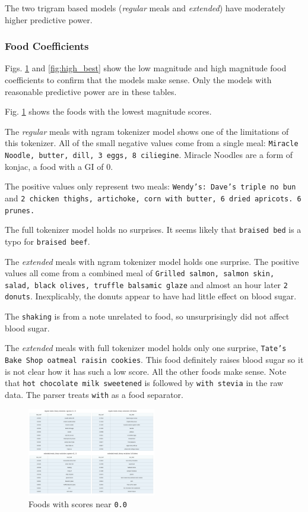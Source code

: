 \documentclass[conference]{IEEEtran}
\begin{document}
The two trigram based models (\emph{regular} meals and \emph{extended}) have moderately higher predictive power.

\subsubsection{Food Coefficients}

Figs. \ref{fig:low_best} and \ref{fig:high_best} show the low magnitude and high magnitude food coefficients to confirm that the models make sense. Only the models with reasonable predictive power are in these tables.

Fig. \ref{fig:low_best} shows the foods with the lowest magnitude scores.

The \emph{regular} meals with ngram tokenizer model shows one of the limitations of this tokenizer. All of the small negative values come from a single meal: \texttt{Miracle Noodle, butter, dill, 3 eggs, 8 ciliegine}. Miracle Noodles are a form of konjac, a food with a GI of 0.

The positive values only represent two meals: \texttt{Wendy's: Dave's triple no bun} and \texttt{2 chicken thighs, artichoke, corn with butter, 6 dried apricots. 6 prunes.}

The full tokenizer model holds no surprises. It seems likely that \texttt{braised bed} is a typo for \texttt{braised beef}.

The \emph{extended} meals with ngram tokenizer model holds one surprise. The positive values all come from a combined meal of \texttt{Grilled salmon, salmon skin, salad, black olives, truffle balsamic glaze} and almost an hour later \texttt{2 donuts}. Inexplicably, the donuts appear to have had little effect on blood sugar.

The \texttt{shaking} is from a note unrelated to food, so unsurprisingly did not affect blood sugar.

The \emph{extended} meals with full tokenizer model holds only one surprise, \texttt{Tate's Bake Shop oatmeal raisin cookies}. This food definitely raises blood sugar so it is not clear how it has such a low score. All the other foods make sense. Note that \texttt{hot chocolate milk sweetened} is followed by \texttt{with stevia} in the raw data. The parser treats \texttt{with} as a food separator.

\begin{figure}[tbp]
    \includegraphics[width=0.5\textwidth]{images/low_gplus_best_models.png}
    \caption{Foods with scores near \texttt{0.0}}
    \label{fig:low_best}
\end{figure}
\end{document}
